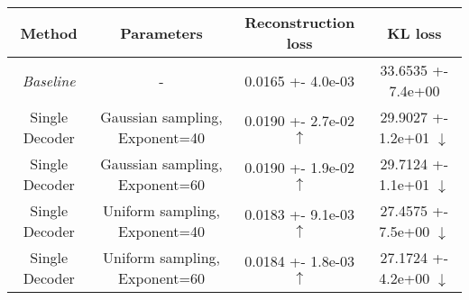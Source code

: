 \centering
\scriptsize
\begin{tabular}{||c|c|c|c||}
\hline
 Method & Parameters & Reconstruction loss & KL loss \\
\hline
\textit{Baseline} & - & 0.0165 +- 4.0e-03 & 33.6535 +- 7.4e+00 \\
\hline
Single Decoder & Gaussian sampling, Exponent=40 & 0.0190 +- 2.7e-02  $\uparrow$ & 29.9027 +- 1.2e+01  $\downarrow$ \\
\hline
Single Decoder & Gaussian sampling, Exponent=60 & 0.0190 +- 1.9e-02  $\uparrow$ & 29.7124 +- 1.1e+01  $\downarrow$ \\
\hline
Single Decoder & Uniform sampling, Exponent=40 & 0.0183 +- 9.1e-03  $\uparrow$ & 27.4575 +- 7.5e+00  $\downarrow$ \\
\hline
Single Decoder & Uniform sampling, Exponent=60 & 0.0184 +- 1.8e-03  $\uparrow$ & 27.1724 +- 4.2e+00  $\downarrow$ \\
\hline
\end{tabular}
